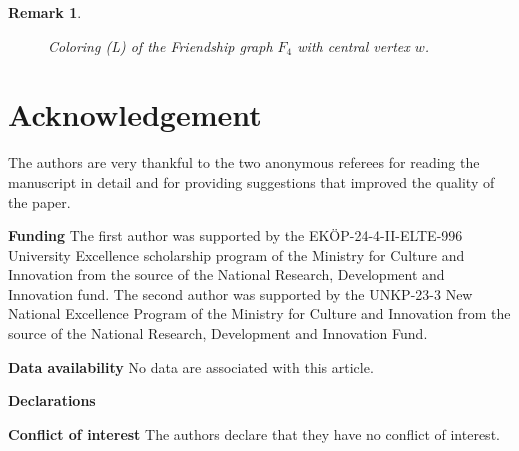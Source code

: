 \documentclass[12pt,reqno,a4paper]{amsart}
\theoremstyle{definition}
\newtheorem{remark}[defn]{Remark}
\begin{document}
\begin{remark}
\begin{figure}[!ht]
\begin{minipage}{\textwidth}
\end{minipage}
\caption{\em Coloring (L) of the Friendship graph $F_{4}$ with central vertex $w$.}
\label{Figure 6}
\end{figure}

\end{remark}

\section{Acknowledgement} The authors are very thankful to the two anonymous referees for reading the manuscript in detail and for providing suggestions that improved the quality of the paper.

\textbf{Funding} The first author was supported by the EK\"{O}P-24-4-II-ELTE-996 University Excellence scholarship program of the Ministry for Culture and Innovation from the source of the National Research, Development and Innovation fund. The second author was supported by the UNKP-23-3 New National Excellence Program of the Ministry for Culture and Innovation from the source of the National Research, Development and Innovation Fund.

\textbf{Data availability} No data are associated with this article.
 

\textbf{Declarations}

\textbf{Conflict of interest} The authors declare that they have no conflict of interest.
\end{document}
